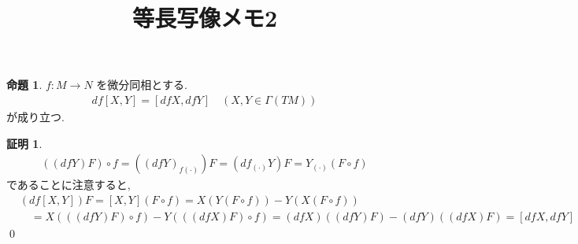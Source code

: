 \documentclass[twocolumn, landscape, a4paper , 8pt, fleqn, titlepage ]{jsarticle}
\title{等長写像メモ2}
\author{}
\date{}
\theoremstyle{definition}
\newtheorem{prop}[dfn]{命題}
\newtheorem*{pf*}{証明}
\begin{document}
\maketitle
\scriptsize 

\section{}

\begin{prop}
$f: M \rightarrow N$ を微分同相とする. 
\begin{align*} df[X,Y] = [dfX, dfY] \quad (X,Y \in \Gamma(TM))\end{align*}
が成り立つ. 
\end{prop}
\begin{pf*}
\begin{align*} ((dfY)F)\circ f = ((dfY)_{f(\cdot)})F = (df_{(\cdot)} Y) F = Y_{(\cdot)}(F\circ f) \end{align*}
であることに注意すると, 
\begin{align*} &(df[X,Y]) F = [X,Y] (F \circ f) = X (Y(F \circ f)) - Y(X(F \circ f)) \\& \quad = X(((dfY) F) \circ f) - Y (((dfX) F) \circ f) = (dfX)((dfY)F) - (dfY)((dfX)F) = [dfX, dfY] \end{align*}
\qed
\end{pf*}
\end{document}
